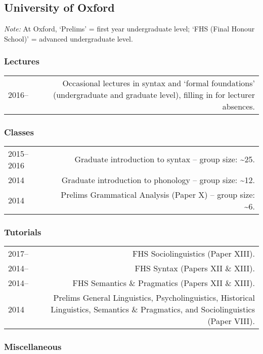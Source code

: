 \documentclass[11pt,a4paper,twoside]{article}
\makeatletter
\newenvironment{cvsection}{%
  \setlength{\extrarowheight}{0.70ex}
  \begin{longtable}[l]{@{} L R @{}}
}{%
  \end{longtable}
}
\makeatother
\begin{document}
\subsection*{University of Oxford}
\textit{Note:} At Oxford, `Prelims' = first year undergraduate level; `FHS (Final Honour School)' = advanced undergraduate level.

\subsubsection*{Lectures}
\begin{cvsection}
2016--  & Occasional lectures in syntax and `formal foundations' (undergraduate and graduate level), filling in for lecturer absences.
\end{cvsection}

\subsubsection*{Classes}

\begin{cvsection}
2015--2016	&	Graduate introduction to syntax -- group size: \textasciitilde{}25.\\
2014			  &	Graduate introduction to phonology -- group size: \textasciitilde{}12.\\
2014			  &	Prelims Grammatical Analysis (Paper X) -- group size: \textasciitilde{}6.
\end{cvsection}

\subsubsection*{Tutorials}

\begin{cvsection}
2017--			&	FHS Sociolinguistics (Paper XIII).\\
2014--			&	FHS Syntax (Papers XII \& XIII).\\
2014--			&	FHS Semantics \& Pragmatics (Papers XII \& XIII).\\
2014				&	Prelims General Linguistics, Psycholinguistics, Historical Linguistics, Semantics \& 					Pragmatics, and Sociolinguistics (Paper VIII).\\
\end{cvsection}

\subsubsection*{Miscellaneous}
\end{document}
